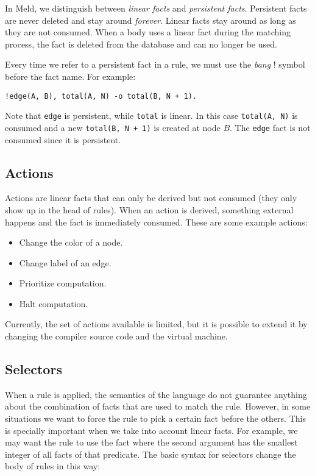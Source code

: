 \documentclass[11pt]{article}
\begin{document}
In Meld, we distinguish between \emph{linear facts} and \emph{persistent facts}. Persistent facts are never deleted and stay around \emph{forever}.
Linear facts stay around as long as they are not consumed. When a body uses a linear fact during the matching process, the fact is deleted from the database and can no longer be used.

Every time we refer to a persistent fact in a rule, we must use the \emph{bang} ! symbol before the fact name. For example:

\begin{verbatim}
!edge(A, B), total(A, N) -o total(B, N + 1).
\end{verbatim}

Note that \texttt{edge} is persistent, while \texttt{total} is linear. In this case \texttt{total(A, N)} is consumed and a new \texttt{total(B, N + 1)} is created at node $B$.
The \texttt{edge} fact is not consumed since it is persistent.

\subsection{Actions}

Actions are linear facts that can only be derived but not consumed (they only show up in the head of rules). When an action is derived, something external happens and the fact is immediately consumed. These are some example actions:

\begin{itemize}
\item Change the color of a node.
\item Change label of an edge.
\item Prioritize computation.
\item Halt computation.
\end{itemize}

Currently, the set of actions available is limited, but it is possible to extend it by changing the compiler source code and the virtual machine.

\subsection{Selectors}

When a rule is applied, the semantics of the language do not guarantee anything about the combination of facts that are used to match the rule. However, in some situations we want to force the rule to pick a certain fact before the others. This is specially important when we take into account linear facts. For example, we may want the rule to use the fact where the second argument has the smallest integer of all facts of that predicate. The basic syntax for selectors change the body of rules in this way:
\end{document}
